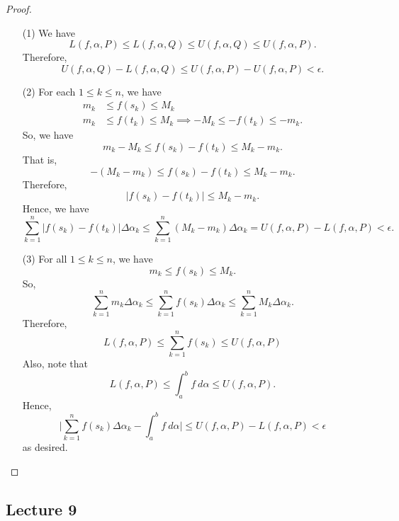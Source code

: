\begin{proof}
\begin{enumerate}
    \item[(1)] We have 
        \[  L(f,\alpha, P) \leq L(f,\alpha, Q ) \leq U(f,\alpha, Q) \leq U(f,\alpha, P). \]
        Therefore, 
        \[  U(f,\alpha, Q ) - L(f,\alpha,Q) \leq U(f,\alpha, P) - U(f,\alpha, P) < \epsilon. \]
    \item[(2)] For each \( 1 \leq k \leq n  \), we have 
        \begin{align*}
            {m}_{k } &\leq f({s}_{k}) \leq {M}_{k} \\
            {m}_{k}&\leq f({t}_{k}) \leq {M}_{k} \implies - {M}_{k } \leq - f({t}_{k}) \leq - {m}_{k}.
        \end{align*}
        So, we have 
        \[  {m}_{k } - {M}_{k } \leq f({s}_{k}) - f({t}_{k}) \leq {M}_{k } - {m}_{k}. \]
        That is, 
        \[  - ({M}_{k } - {m}_{k}) \leq f({s}_{k}) - f({t}_{k}) \leq {M}_{k } - {m}_{k}. \]
        Therefore, 
        \[  | f({s}_{k}) - f({t}_{k})  | \leq {M}_{k } - {m}_{k}. \]
        Hence, we have 
        \[ \sum_{ k=1  }^{ n } | f({s}_{k}) - f({t}_{k}) |  \Delta {\alpha}_{k } \leq \sum_{ k=1  }^{ n } ({M}_{k } - {m}_{k}) \Delta {\alpha}_{k } = U(f,\alpha, P) - L(f,\alpha,P) < \epsilon. \]
    \item[(3)] For all \( 1 \leq k \leq n  \), we have 
        \[  {m}_{k } \leq f({s}_{k}) \leq {M}_{k }. \]
        So, 
        \[  \sum_{ k=1  }^{ n } {m}_{k } \Delta {\alpha}_{k } \leq \sum_{ k=1  }^{ n } f({s}_{k}) \Delta {\alpha}_{k } \leq \sum_{ k=1  }^{ n } {M}_{k } \Delta {\alpha}_{k }. \]
        Therefore, 
        \[  L(f,\alpha, P) \leq \sum_{ k=1  }^{ n } f({s}_{k}) \leq U(f,\alpha,P) \tag{I} \]
        Also, note that 
        \[  L(f,\alpha,P) \leq \int_{ a }^{ b }  f  \ d \alpha \leq U(f,\alpha, P). \tag{II} \]
        Hence,
        \[  \Big| \sum_{ k=1  }^{ n } f({s}_{k}) \Delta {\alpha}_{k } - \int_{ a }^{ b }  f \ d \alpha \Big|  \leq U(f,\alpha, P) - L(f,\alpha, P) < \epsilon \]
        as desired.
\end{enumerate}
\end{proof}









\subsection{Lecture 9}

